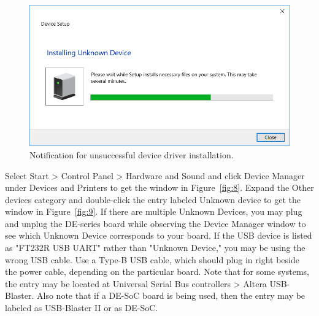 \documentclass[11pt, twoside, pdftex]{article}
\begin{document}
~\\
\begin{figure}[H]
	\begin{center}
		\includegraphics[scale=0.65]{figures/figure7.png}
		\caption{Notification for unsuccessful device driver installation.} 
		\label{fig:7}
	\end{center}
\end{figure}

Select {\sf Start > Control Panel > Hardware and Sound} and click {\sf Device Manager}
under {Devices and Printers} to get the window in Figure~\ref{fig:8}.  Expand the
{\sf Other devices} category and double-click the entry labeled {\sf Unknown device} to get the 
window in Figure~\ref{fig:9}. If there are multiple Unknown Devices, you may plug and unplug the DE-series board
while observing the Device Manager window to see which Unknown Device corresponds to your board. If the USB device is listed as "FT232R USB UART" rather than "Unknown Device," you may be using the wrong USB cable. Use a Type-B USB cable, which should plug in right beside the power cable, depending on the particular board.
Note that for some systems, the entry may be located at {\sf Universal Serial Bus controllers > Altera USB-Blaster}. 
Also note that if a DE-SoC board is being used, then the entry may be
labeled as {\sf USB-Blaster II} or as {\sf DE-SoC}.
\end{document}
